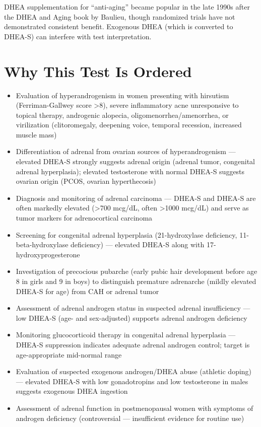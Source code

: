 DHEA supplementation for ``anti-aging'' became popular in the late 1990s after the DHEA and Aging book by Baulieu, though randomized trials have not demonstrated consistent benefit. Exogenous DHEA (which is converted to DHEA-S) can interfere with test interpretation.

\section*{Why This Test Is Ordered}
\begin{itemize}
  \item Evaluation of hyperandrogenism in women presenting with hirsutism (Ferriman-Gallwey score >8), severe inflammatory acne unresponsive to topical therapy, androgenic alopecia, oligomenorrhea/amenorrhea, or virilization (clitoromegaly, deepening voice, temporal recession, increased muscle mass)
  \item Differentiation of adrenal from ovarian sources of hyperandrogenism --- elevated DHEA-S strongly suggests adrenal origin (adrenal tumor, congenital adrenal hyperplasia); elevated testosterone with normal DHEA-S suggests ovarian origin (PCOS, ovarian hyperthecosis)
  \item Diagnosis and monitoring of adrenal carcinoma --- DHEA-S and DHEA-S are often markedly elevated (>700 mcg/dL, often >1000 mcg/dL) and serve as tumor markers for adrenocortical carcinoma \cite{arlt2011urine}
  \item Screening for congenital adrenal hyperplasia (21-hydroxylase deficiency, 11-beta-hydroxylase deficiency) --- elevated DHEA-S along with 17-hydroxyprogesterone
  \item Investigation of precocious pubarche (early pubic hair development before age 8 in girls and 9 in boys) to distinguish premature adrenarche (mildly elevated DHEA-S for age) from CAH or adrenal tumor
  \item Assessment of adrenal androgen status in suspected adrenal insufficiency --- low DHEA-S (age- and sex-adjusted) supports adrenal androgen deficiency
  \item Monitoring glucocorticoid therapy in congenital adrenal hyperplasia --- DHEA-S suppression indicates adequate adrenal androgen control; target is age-appropriate mid-normal range
  \item Evaluation of suspected exogenous androgen/DHEA abuse (athletic doping) --- elevated DHEA-S with low gonadotropins and low testosterone in males suggests exogenous DHEA ingestion
  \item Assessment of adrenal function in postmenopausal women with symptoms of androgen deficiency (controversial --- insufficient evidence for routine use)
\end{itemize}

